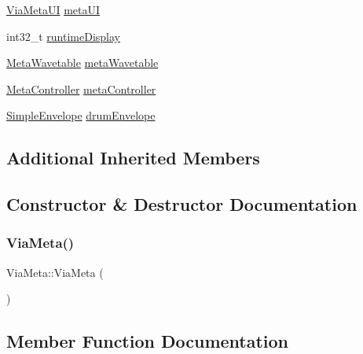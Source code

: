 \begin{DoxyCompactItemize}
\mbox{\hyperlink{class_via_meta_1_1_via_meta_u_i}{Via\+Meta\+UI}} \mbox{\hyperlink{class_via_meta_a55ce1aad65d98dc744ad0efcfd9047d1}{meta\+UI}}
\item 
int32\+\_\+t \mbox{\hyperlink{class_via_meta_a849f78f2ca06dd8d5df280ac74f7f2df}{runtime\+Display}}
\item 
\mbox{\hyperlink{class_meta_wavetable}{Meta\+Wavetable}} \mbox{\hyperlink{class_via_meta_a181153d602eb58e635cad28f06afa7eb}{meta\+Wavetable}}
\item 
\mbox{\hyperlink{class_meta_controller}{Meta\+Controller}} \mbox{\hyperlink{class_via_meta_ae825571bb029bcd9ddbe8a2c19f041a5}{meta\+Controller}}
\item 
\mbox{\hyperlink{class_simple_envelope}{Simple\+Envelope}} \mbox{\hyperlink{class_via_meta_a92a7fdb0c5bd482b06467217c2e16f31}{drum\+Envelope}}
\end{DoxyCompactItemize}
\subsection*{Additional Inherited Members}


\subsection{Constructor \& Destructor Documentation}
\mbox{\label{class_via_meta_af8d8701d58f2db0e2269594d15690290}} 
\subsubsection{\texorpdfstring{Via\+Meta()}{ViaMeta()}}
{\footnotesize\ttfamily Via\+Meta\+::\+Via\+Meta (\begin{DoxyParamCaption}{ }\end{DoxyParamCaption})\hspace{0.3cm}{\ttfamily [inline]}}



\subsection{Member Function Documentation}
\mbox{\label{class_via_meta_a3d97e2435f744b283f1f844ad88cb74d}} 
